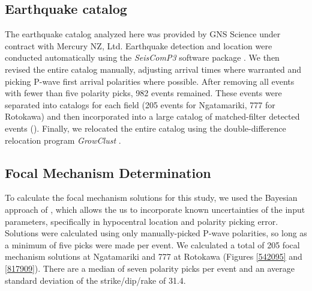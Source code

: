 \subsection{Earthquake catalog}
The earthquake catalog analyzed here was provided by GNS Science under contract with Mercury NZ, Ltd. Earthquake detection and location were conducted automatically using the \textit{SeisComP3} software package \citep{Weber2007}. We then revised the entire catalog manually, adjusting arrival times where warranted and picking P-wave first arrival polarities where possible. After removing all events with fewer than five polarity picks, 982 events remained. These events were separated into catalogs for each field (205 events for Ngatamariki, 777 for Rotokawa) and then incorporated into a large catalog of matched-filter detected events (\citet[described in detail by][]{j2019}). Finally, we relocated the entire catalog using the double-difference relocation program \textit{GrowClust} \citep{Trugman_2017}.

\subsection{Focal Mechanism Determination}
To calculate the focal mechanism solutions for this study, we used the Bayesian approach of \citet{Walsh_2009}, which allows the us to incorporate known uncertainties of the input parameters, specifically in hypocentral location and polarity picking error. Solutions were calculated using only manually-picked P-wave polarities, so long as a minimum of five picks were made per event. We calculated a total of 205 focal mechanism solutions at Ngatamariki and 777 at Rotokawa (Figures \ref{542095} and \ref{817909}). There are a median of seven polarity picks per event and an average standard deviation of the strike/dip/rake of 31.4\textdegree{}.

